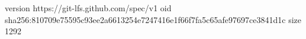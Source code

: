 version https://git-lfs.github.com/spec/v1
oid sha256:810709e75595c93ee2a6613254e7247416e1f66f7fa5c65afe97697ce3841d1c
size 1292
